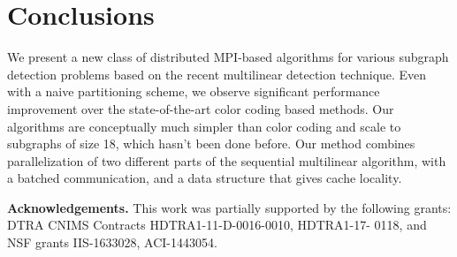 \section{Conclusions}
\label{sec:conc}
We present a new class of distributed MPI-based  algorithms for various subgraph detection problems based on the recent multilinear detection technique.
Even with a naive partitioning scheme, we observe significant performance improvement over the state-of-the-art color coding based methods.
Our algorithms are conceptually much simpler than color coding and scale to subgraphs of size 18, which hasn't been done before. Our method combines parallelization of two different parts of the sequential multilinear algorithm, with a batched communication, and a data structure that gives cache locality.

\noindent
\textbf{Acknowledgements.} This work was partially supported by the following grants: DTRA CNIMS Contracts HDTRA1-11-D-0016-0010, HDTRA1-17- 0118, and NSF grants IIS-1633028, ACI-1443054.

